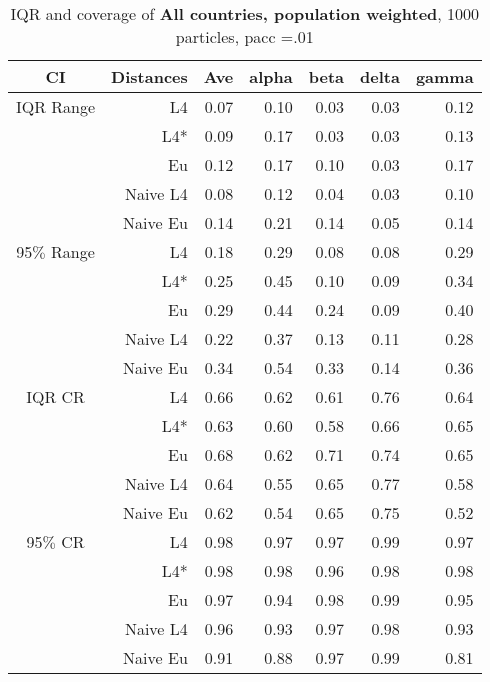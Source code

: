 \documentclass[a4paper,12pt,twoside]{book}
\begin{document}
\begin{table}[H]
\centering
\caption{IQR and coverage of \textbf{All countries, population weighted}, 1000 particles, pacc =.01}

\begin{tabular}{crrrrrr}
  \hline
{\color{blue}CI} & Distances & Ave & alpha & beta & delta & gamma \\ 
  \hline
{\color{blue}IQR Range} & L4  &0.07 & 0.10 & 0.03 & 0.03 & 0.12 \\ 
 
&L4*  & 0.09 & 0.17 & 0.03 & 0.03 & 0.13 \\ 
  
&Eu &     0.12 & 0.17 & 0.10 & 0.03 & 0.17 \\ 
  
  
&Naive L4& 0.08 & 0.12 & 0.04 & 0.03 & 0.10 \\
&Naive Eu & 0.14 & 0.21 & 0.14 & 0.05 & 0.14 \\ 
   
    {\color{blue}95$\%$ Range} & L4  &0.18 & 0.29 & 0.08 & 0.08 & 0.29 \\ 
  
    &L4*  &  0.25 & 0.45 & 0.10 & 0.09 & 0.34 \\ 

&Eu &     0.29 & 0.44 & 0.24 & 0.09 & 0.40 \\ 
  
&Naive L4&    0.22 & 0.37 & 0.13 & 0.11 & 0.28 \\ 
 
&Naive Eu &   0.34 & 0.54 & 0.33 & 0.14 & 0.36 \\ 
  
   \hline
   
{\color{blue} IQR CR } & L4  &0.66 & 0.62 & 0.61 & 0.76 & 0.64 \\ 
  

&L4*  &  0.63 & 0.60 & 0.58 & 0.66 & 0.65 \\ 
  
 
&Eu &    0.68 & 0.62 & 0.71 & 0.74 & 0.65 \\ 
  
  
&Naive L4& 0.64 & 0.55 & 0.65 & 0.77 & 0.58 \\ 
&Naive Eu &  0.62 & 0.54 & 0.65 & 0.75 & 0.52 \\ 
  
  

 {\color{blue} 95$\%$ CR }& L4  &0.98 & 0.97 & 0.97 & 0.99 & 0.97 \\ 
 
 
  &L4*  &     0.98 & 0.98 & 0.96 & 0.98 & 0.98 \\ 
   
 
&Eu &   0.97 & 0.94 & 0.98 & 0.99 & 0.95 \\ 
  
 
&Naive L4&   0.96 & 0.93 & 0.97 & 0.98 & 0.93 \\
 
&Naive Eu &     0.91 & 0.88 & 0.97 & 0.99 & 0.81 \\ 
  
\end{tabular}

\end{table}
\end{document}
